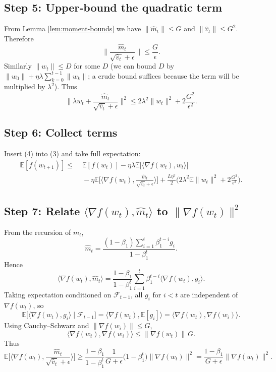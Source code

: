 \documentclass{article}
\newcommand{\E}{\mathbb{E}}
\begin{document}
\subsection*{Step 5: Upper‑bound the quadratic term}
From Lemma \ref{lem:moment-bounds} we have $\|\hat m_{t}\|\le G$ and $\|\hat v_{t}\|\le G^{2}$. Therefore
\[
\Big\|\frac{\hat m_{t}}{\sqrt{\hat v_{t}}+\epsilon}\Big\|
    \le \frac{G}{\epsilon}.
\]
Similarly $\|w_{t}\|\le D$ for some $D$ (we can bound $D$ by $ \|w_{0}\|+ \eta\lambda\sum_{k=0}^{t-1}\|w_{k}\|$; a crude bound suffices because the term will be multiplied by $\lambda^{2}$).  
Thus
\[
\Big\|\lambda w_{t}
    +\frac{\hat m_{t}}{\sqrt{\hat v_{t}}+\epsilon}\Big\|^{2}
    \le 2\lambda^{2}\|w_{t}\|^{2}+2\frac{G^{2}}{\epsilon^{2}}. \tag{4}
\]

\subsection*{Step 6: Collect terms}
Insert (4) into (3) and take full expectation:
\[
\begin{aligned}
\E[f(w_{t+1})]\le &\; \E[f(w_{t})]
 -\eta\lambda\E\big[\langle\nabla f(w_{t}),w_{t}\rangle\big] \\
 &\;-\eta\E\Big[\Big\langle\nabla f(w_{t}),\frac{\hat m_{t}}{\sqrt{\hat v_{t}}+\epsilon}\Big\rangle\Big]
 +\frac{L\eta^{2}}{2}\Big(2\lambda^{2}\E\|w_{t}\|^{2}+2\frac{G^{2}}{\epsilon^{2}}\Big). \tag{5}
\end{aligned}
\]

\subsection*{Step 7: Relate $\langle\nabla f(w_{t}),\hat m_{t}\rangle$ to $\|\nabla f(w_{t})\|^{2}$}
From the recursion of $m_{t}$,
\[
\hat m_{t}= \frac{(1-\beta_{1})\sum_{i=1}^{t}\beta_{1}^{t-i}g_{i}}{1-\beta_{1}^{t}}.
\]
Hence
\[
\langle\nabla f(w_{t}),\hat m_{t}\rangle
   = \frac{1-\beta_{1}}{1-\beta_{1}^{t}}\sum_{i=1}^{t}\beta_{1}^{t-i}\langle\nabla f(w_{t}),g_{i}\rangle.
\]
Taking expectation conditioned on $\mathcal{F}_{t-1}$, all $g_{i}$ for $i<t$ are independent of $\nabla f(w_{t})$, so
\[
\E\big[\langle\nabla f(w_{t}),g_{i}\rangle\mid\mathcal{F}_{t-1}\big]=\langle\nabla f(w_{t}),\E[g_{i}]\rangle
   =\langle\nabla f(w_{t}),\nabla f(w_{i})\rangle.
\]
Using Cauchy–Schwarz and $\| \nabla f(w_{i})\|\le G$,
\[
\langle\nabla f(w_{t}),\nabla f(w_{i})\rangle\le \|\nabla f(w_{t})\|\,G.
\]
Thus
\[
\E\Big[\Big\langle\nabla f(w_{t}),\frac{\hat m_{t}}{\sqrt{\hat v_{t}}+\epsilon}\Big\rangle\Big]
 \ge \frac{1-\beta_{1}}{1-\beta_{1}^{t}}\frac{1}{G+\epsilon}
      \big(1-\beta_{1}^{t}\big)\|\nabla f(w_{t})\|^{2}
 =\frac{1-\beta_{1}}{G+\epsilon}\|\nabla f(w_{t})\|^{2}. \tag{6}
\]
\end{document}
